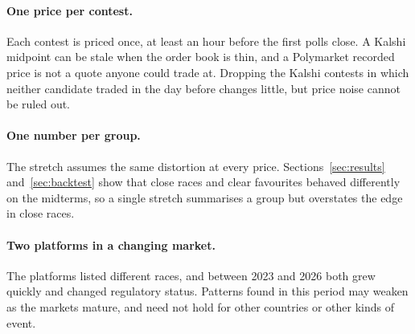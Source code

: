 \paragraph{One price per contest.} Each contest is priced once, at least an hour before the first polls close. A Kalshi
midpoint can be stale when the order book is thin, and a Polymarket recorded price is not a quote anyone could trade at.
Dropping the Kalshi contests in which neither candidate traded in the day before changes little, but price noise
cannot be ruled out.

\paragraph{One number per group.} The stretch assumes the same distortion at every price. Sections~\ref{sec:results}
and~\ref{sec:backtest} show that close races and clear favourites behaved differently on the midterms, so a single
stretch summarises a group but overstates the edge in close races.

\paragraph{Two platforms in a changing market.} The platforms listed different races, and between 2023 and 2026 both
grew quickly and changed regulatory status. Patterns found in this period may weaken as the markets mature, and need
not hold for other countries or other kinds of event.

